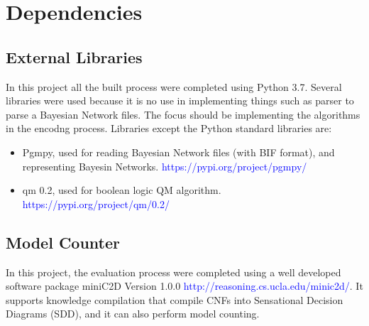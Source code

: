\newpage
\section{Dependencies}
\subsection{External Libraries}
In this project all the built process were completed using Python 3.7. Several libraries were used because it is no use in implementing things such as parser to parse a Bayesian Network files. The focus should be implementing the algorithms in the encodng process. Libraries except the Python standard libraries are:
\begin{itemize}
      \item Pgmpy, used for reading Bayesian Network files (with BIF format), and representing Bayesin Networks. \textcolor{blue}{https://pypi.org/project/pgmpy/}
     \item qm 0.2, used for boolean logic QM algorithm.
    \textcolor{blue}{https://pypi.org/project/qm/0.2/}
\end{itemize}
    


\subsection{Model Counter}
In this project, the evaluation process were completed using a well developed software package miniC2D Version 1.0.0 \textcolor{blue}{http://reasoning.cs.ucla.edu/minic2d/}. It supports knowledge compilation that compile CNFs into Sensational Decision Diagrams (SDD), and it can also perform model counting. 